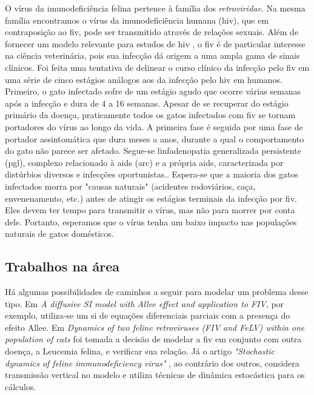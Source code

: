 \documentclass{article}
\begin{document}
\noindent O vírus da imunodeficiência felina pertence à família dos \textit{retroviridae}. Na mesma família encontramos o vírus da imunodeficiência humana (\gls{hiv}), que em contraposição ao \gls{fiv}, pode ser transmitido através de relações sexuais.
Além de fornecer um modelo relevante para estudos de \gls{hiv}   , o \gls{fiv} é de particular interesse na ciência veterinária, pois sua infecção dá origem a uma ampla gama de sinais clínicos.
Foi feita uma tentativa de delinear o curso clínico da infecção pelo \gls{fiv} em uma série de cinco estágios análogos aos da infecção pelo \gls{hiv} em humanos. Primeiro, o gato infectado sofre de um estágio agudo que ocorre várias semanas após a infecção e dura de 4 a 16 semanas. Apesar de se recuperar do estágio primário da doença, praticamente todos os gatos infectados com \gls{fiv} se tornam portadores do vírus ao longo da vida. A primeira fase é seguida por uma fase de portador assintomática que dura meses a anos, durante a qual o comportamento do gato não parece ser afetado. Segue-se linfadenopatia generalizada persistente (\gls{pgl}), complexo relacionado à \gls{aids} (\gls{arc}) e a própria \gls{aids}, caracterizada por distúrbios diversos e infecções oportunistas.\cite{base}. Espera-se que a maioria dos gatos infectados morra por "causas naturais" (acidentes rodoviários, caça, envenenamento, etc.) antes de atingir os estágios terminais da infecção por \gls{fiv}. Eles devem ter tempo para transmitir o vírus, mas não para morrer por conta dele. Portanto, esperamos que o vírus tenha um baixo impacto nas populações naturais de gatos domésticos.

\subsection{Trabalhos na área}
Há algumas possibilidades de caminhos a seguir para modelar um problema desse tipo. Em \textit{A diffusive SI model with Allee effect and application to FIV}\cite{difusao}, por exemplo, utiliza-se um \gls{si} de equações diferenciais parciais com a presença do efeito Allee. Em \textit{Dynamics of two feline retroviruses (FIV and FeLV)
within one population of cats} \cite{franck} foi tomada a decisão de modelar a \gls{fiv} em conjunto com outra doença, a Leucemia felina, e verificar sua relação. Já o artigo \textit{"Stochastic dynamics of feline immunodeficiency virus"} \cite{estocastico}, ao contrário dos outros, considera transmissão vertical no modelo e utiliza técnicas de dinâmica estocástica para os cálculos.
\end{document}
